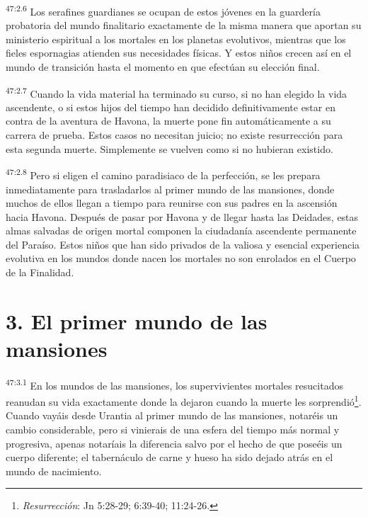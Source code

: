 \par
\textsuperscript{47:2.6} Los serafines guardianes se ocupan de estos jóvenes en la guardería probatoria del mundo finalitario exactamente de la misma manera que aportan su ministerio espiritual a los mortales en los planetas evolutivos, mientras que los fieles espornagias atienden sus necesidades físicas. Y estos niños crecen así en el mundo de transición hasta el momento en que efectúan su elección final.

\par
\textsuperscript{47:2.7} Cuando la vida material ha terminado su curso, si no han elegido la vida ascendente, o si estos hijos del tiempo han decidido definitivamente estar en contra de la aventura de Havona, la muerte pone fin automáticamente a su carrera de prueba. Estos casos no necesitan juicio; no existe resurrección para esta segunda muerte. Simplemente se vuelven como si no hubieran existido.

\par
\textsuperscript{47:2.8} Pero si eligen el camino paradisiaco de la perfección, se les prepara inmediatamente para trasladarlos al primer mundo de las mansiones, donde muchos de ellos llegan a tiempo para reunirse con sus padres en la ascensión hacia Havona. Después de pasar por Havona y de llegar hasta las Deidades, estas almas salvadas de origen mortal componen la ciudadanía ascendente permanente del Paraíso. Estos niños que han sido privados de la valiosa y esencial experiencia evolutiva en los mundos donde nacen los mortales no son enrolados en el Cuerpo de la Finalidad.

\section*{3. El primer mundo de las mansiones}
\par
\textsuperscript{47:3.1} En los mundos de las mansiones, los supervivientes mortales resucitados reanudan su vida exactamente donde la dejaron cuando la muerte les sorprendió\footnote{\textit{Resurrección}: Jn 5:28-29; 6:39-40; 11:24-26.}. Cuando vayáis desde Urantia al primer mundo de las mansiones, notaréis un cambio considerable, pero si vinierais de una esfera del tiempo más normal y progresiva, apenas notaríais la diferencia salvo por el hecho de que poseéis un cuerpo diferente; el tabernáculo de carne y hueso ha sido dejado atrás en el mundo de nacimiento.

